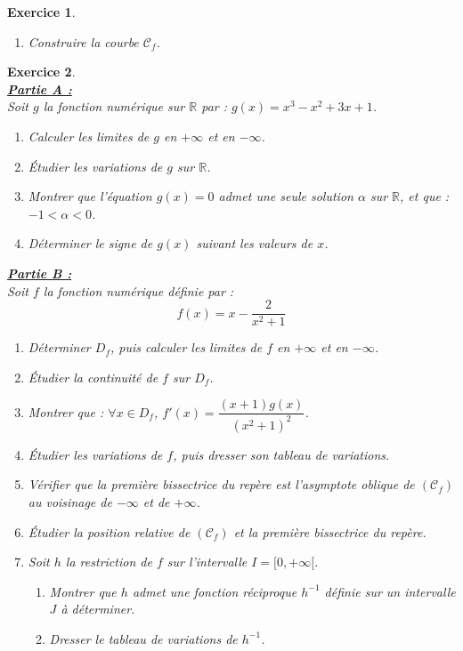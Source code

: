 \documentclass[12pt,a4paper]{article}
\theoremstyle{mystyle}
\newtheorem{exo}{Exercice}
\begin{document}
\begin{multicols*}{2}
\begin{exo}
\begin{enumerate}
    \item[4)] Construire la courbe $\mathcal{C}_f$.
 
\end{enumerate}

\end{exo}

\begin{exo}
\text{ }\\
\underline{\textbf{Partie A : }}\\
Soit $g$ la fonction numérique sur $\mathbb{R}$ par : $g(x) = x^3 - x^2 + 3x + 1$.

\begin{enumerate}
    \item Calculer les limites de $g$ en $+\infty$ et en $-\infty$.
    \item Étudier les variations de $g$ sur $\mathbb{R}$.
    \item Montrer que l’équation $g(x) = 0$ admet une seule solution $\alpha$ sur $\mathbb{R}$, et que : $-1 < \alpha < 0$.
    \item Déterminer le signe de $g(x)$ suivant les valeurs de $x$.
\end{enumerate}

\underline{\textbf{Partie B : }}\\
Soit $f$ la fonction numérique définie par : $$f(x) = x - \frac{2}{x^2 + 1}$$

\begin{enumerate}
    \item Déterminer $D_f$, puis calculer les limites de $f$ en $+\infty$ et en $-\infty$.
    \item Étudier la continuité de $f$ sur $D_f$.
    \item Montrer que : $\forall x \in D_f$, $f'(x) = \dfrac{(x+1)g(x)}{(x^2 + 1)^2}$.
    \item Étudier les variations de $f$, puis dresser son tableau de variations.
    \item Vérifier que la première bissectrice du repère est l’asymptote oblique de $(\mathcal{C}_f)$ au voisinage de $-\infty$ et de $+\infty$.
    \item Étudier la position relative de $(\mathcal{C}_f)$ et la première bissectrice du repère.
    \item Soit $h$ la restriction de $f$ sur l’intervalle $I = [0,+\infty[$.
    \begin{enumerate}
        \item Montrer que $h$ admet une fonction réciproque $h^{-1}$ définie sur un intervalle $J$ à déterminer.
        \item Dresser le tableau de variations de $h^{-1}$.
    \end{enumerate}
\end{enumerate}
\end{exo}





\end{multicols*}
\end{document}
